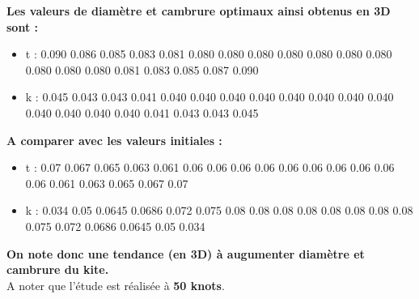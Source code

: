 \documentclass[conference]{IEEEtran}
\begin{document}
\textbf{Les valeurs de diamètre et cambrure optimaux ainsi obtenus en 3D sont : 
}

\begin{itemize}
    \item t : 0.090 0.086 0.085 0.083 0.081 0.080 0.080  0.080 0.080 0.080 0.080  0.080 0.080 0.080 0.080 0.081 0.083 0.085 0.087 0.090
    \item k : 0.045 0.043 0.043 0.041 0.040 0.040 0.040  0.040 0.040 0.040 0.040 0.040 0.040 0.040  0.040 0.040 0.041 0.043 0.043 0.045
\end{itemize}

\textbf{A comparer avec les valeurs initiales :}
\begin{itemize}
    \item t : 0.07 0.067 0.065 0.063 0.061 0.06 0.06  0.06 0.06 0.06  0.06  0.06 0.06 0.06  0.06 0.061 0.063 0.065 0.067 0.07
    \item k : 0.034 0.05 0.0645 0.0686 0.072 0.075 0.08 0.08 0.08 0.08 0.08 0.08 0.08 0.08 0.075 0.072 0.0686 0.0645 0.05 0.034
\end{itemize}

\textbf{On note donc une tendance (en 3D) à augumenter diamètre et cambrure du kite. }\\
A noter que l'étude est réalisée à \textbf{50 knots}. 
\end{document}
